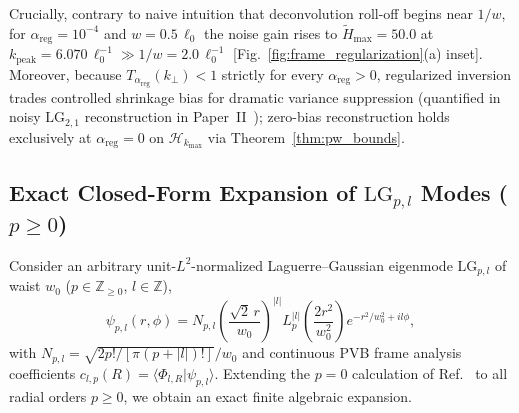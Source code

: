 \documentclass[aps,pra,reprint,nofootinbib,floatfix,longbibliography]{revtex4-2}
\theoremstyle{remark}
\newcommand{\braket}[2]{\langle #1 | #2 \rangle}
\newcommand{\abs}[1]{\lvert #1 \rvert}
\begin{document}
Crucially, contrary to naive intuition that deconvolution roll-off begins near $1/w$, for $\alpha_{\mathrm{reg}} = 10^{-4}$ and $w = 0.5\,\ell_0$ the noise gain rises to $\widetilde{H}_{\max} = 50.0$ at $k_{\mathrm{peak}} = 6.070\,\ell_0^{-1} \gg 1/w = 2.0\,\ell_0^{-1}$ [Fig.~\ref{fig:frame_regularization}(a) inset]. Moreover, because $T_{\alpha_{\mathrm{reg}}}(k_\perp) < 1$ strictly for every $\alpha_{\mathrm{reg}} > 0$, regularized inversion trades controlled shrinkage bias for dramatic variance suppression (quantified in noisy $\mathrm{LG}_{2,1}$ reconstruction in Paper~II~\cite{AyalaPaperII}); zero-bias reconstruction holds exclusively at $\alpha_{\mathrm{reg}} = 0$ on $\mathcal{H}_{k_{\max}}$ via Theorem~\ref{thm:pw_bounds}.

\subsection{Exact Closed-Form Expansion of \texorpdfstring{$\mathrm{LG}_{p,l}$}{LG\_\{p,l\}} Modes (\texorpdfstring{$p \ge 0$}{p >= 0})}
\label{subsec:lg_expansion}

Consider an arbitrary unit-$L^2$-normalized Laguerre--Gaussian eigenmode $\mathrm{LG}_{p,l}$ of waist $w_0$ ($p \in \mathbb{Z}_{\ge 0}$, $l \in \mathbb{Z}$),
\begin{equation}
\psi_{p,l}(r,\phi) = N_{p,l}\left(\frac{\sqrt{2}\,r}{w_0}\right)^{\abs{l}} L_p^{\abs{l}}\!\left(\frac{2r^2}{w_0^2}\right) e^{-r^2/w_0^2 + il\phi},
\label{eq:lg_def}
\end{equation}
with $N_{p,l} = \sqrt{2p!/[\pi(p+\abs{l})!]}/w_0$ and continuous PVB frame analysis coefficients $c_{l,p}(R) = \braket{\Phi_{l,R}}{\psi_{p,l}}$. Extending the $p = 0$ calculation of Ref.~\cite{Ferreira2026} to all radial orders $p \ge 0$, we obtain an exact finite algebraic expansion.
\end{document}
